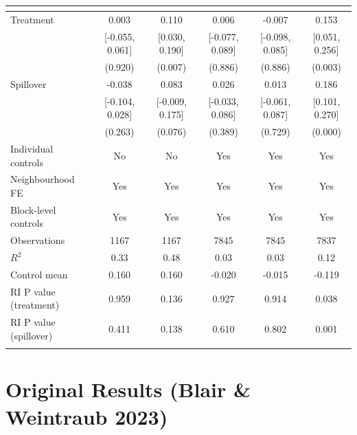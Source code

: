 \documentclass[11pt]{article}
\begin{document}
\begin{table}[htbp]
{\begin{tabular}{@{\extracolsep{4pt}}l*{5}{c}@{}}
                &&&&&\\
\hline
Treatment       &   0.003&   0.110&   0.006&  -0.007&   0.153\\
                &[-0.055, 0.061]&[0.030, 0.190]&[-0.077, 0.089]&[-0.098, 0.085]&[0.051, 0.256]\\
                &  (0.920)&  (0.007)&  (0.886)&  (0.886)&  (0.003)\\
Spillover       &  -0.038&   0.083&   0.026&   0.013&   0.186\\
                &[-0.104, 0.028]&[-0.009, 0.175]&[-0.033, 0.086]&[-0.061, 0.087]&[0.101, 0.270]\\
                &  (0.263)&  (0.076)&  (0.389)&  (0.729)&  (0.000)\\
Individual controls &       No&       No&      Yes&      Yes&      Yes\\
Neighbourhood FE &      Yes&      Yes&      Yes&      Yes&      Yes\\
Block-level controls &      Yes&      Yes&      Yes&      Yes&      Yes\\
Observations    &    1167&    1167&    7845&    7845&    7837\\
$R^2$           &    0.33&    0.48&    0.03&    0.03&    0.12\\
Control mean    &   0.160&   0.160&  -0.020&  -0.015&  -0.119\\
RI P value (treatment)&   0.959&   0.136&   0.927&   0.914&   0.038\\
RI P value (spillover)&   0.411&   0.138&   0.610&   0.802&   0.001\\
\noalign{\smallskip} \hline
\end{tabular}
}
\medskip

\end{table}

\section{Original Results (Blair \& Weintraub 2023)}
\end{document}
